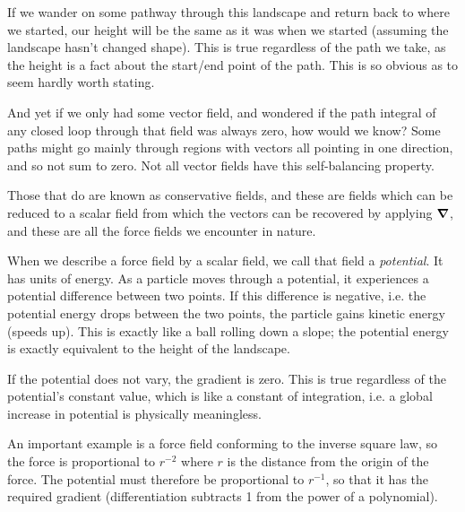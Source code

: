 If we wander on some pathway through this landscape and return back to where we started, our height will be the same as it was when we started (assuming the landscape hasn't changed shape). This is true regardless of the path we take, as the height is a fact about the start/end point of the path. This is so obvious as to seem hardly worth stating.

And yet if we only had some vector field, and wondered if the path integral of any closed loop through that field was always zero, how would we know? Some paths might go mainly through regions with vectors all pointing in one direction, and so not sum to zero. Not all vector fields have this self-balancing property.

Those that do are known as conservative fields, and these are fields which can be reduced to a scalar field from which the vectors can be recovered by applying $\grad$, and these are all the force fields we encounter in nature.

When we describe a force field by a scalar field, we call that field a \textit{potential}. It has units of energy. As a particle moves through a potential, it experiences a potential difference between two points. If this difference is negative, i.e. the potential energy drops between the two points, the particle gains kinetic energy (speeds up). This is exactly like a ball rolling down a slope; the potential energy is exactly equivalent to the height of the landscape.

If the potential does not vary, the gradient is zero. This is true regardless of the potential's constant value, which is like a constant of integration, i.e. a global increase in potential is physically meaningless.

An important example is a force field conforming to the inverse square law, so the force is proportional to $r^{-2}$ where $r$ is the distance from the origin of the force. The potential must therefore be proportional to $r^{-1}$, so that it has the required gradient (differentiation subtracts 1 from the power of a polynomial).
